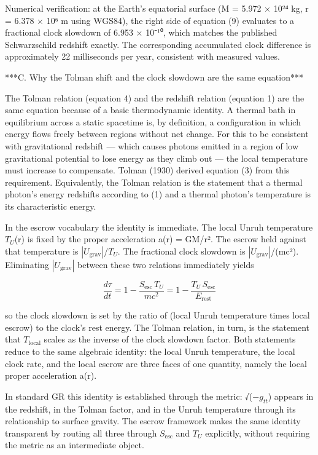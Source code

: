 \documentclass[11pt]{article}
\begin{document}
Numerical verification: at the Earth's equatorial surface (M = 5.972 ×
10²⁴ kg, r = 6.378 × 10⁶ m using WGS84), the right side of equation (9)
evaluates to a fractional clock slowdown of 6.953 × 10⁻¹⁰, which matches
the published Schwarzschild redshift exactly. The corresponding
accumulated clock difference is approximately 22 milliseconds per year,
consistent with measured values.

***C. Why the Tolman shift and the clock slowdown are the same
equation***

The Tolman relation (equation 4) and the redshift relation (equation 1)
are the same equation because of a basic thermodynamic identity. A
thermal bath in equilibrium across a static spacetime is, by definition,
a configuration in which energy flows freely between regions without net
change. For this to be consistent with gravitational redshift --- which
causes photons emitted in a region of low gravitational potential to
lose energy as they climb out --- the local temperature must increase to
compensate. Tolman (1930) derived equation (3) from this requirement.
Equivalently, the Tolman relation is the statement that a thermal
photon's energy redshifts according to (1) and a thermal photon's
temperature is its characteristic energy.

In the escrow vocabulary the identity is immediate. The local Unruh
temperature $T_{U}$(r) is fixed by the proper acceleration a(r) = GM/r². The
escrow held against that temperature is $|U_{\mathrm{grav}}|$/$T_{U}$. The fractional
clock slowdown is $|U_{\mathrm{grav}}|$/(mc²). Eliminating $|U_{\mathrm{grav}}|$ between these
two relations immediately yields

\begin{equation}
  \frac{d\tau}{dt} = 1 - \frac{S_{\mathrm{esc}}\, T_{U}}{mc^{2}} = 1 - \frac{T_{U}\, S_{\mathrm{esc}}}{E_{\mathrm{rest}}}
  \label{eq:10}
\end{equation}

so the clock slowdown is set by the ratio of (local Unruh temperature
times local escrow) to the clock's rest energy. The Tolman relation, in
turn, is the statement that $T_{\mathrm{local}}$ scales as the inverse of the clock
slowdown factor. Both statements reduce to the same algebraic identity:
the local Unruh temperature, the local clock rate, and the local escrow
are three faces of one quantity, namely the local proper acceleration
a(r).

In standard GR this identity is established through the metric: √(−$g_{tt}$)
appears in the redshift, in the Tolman factor, and in the Unruh
temperature through its relationship to surface gravity. The escrow
framework makes the same identity transparent by routing all three
through $S_{\mathrm{esc}}$ and $T_{U}$ explicitly, without requiring the metric as an
intermediate object.
\end{document}
